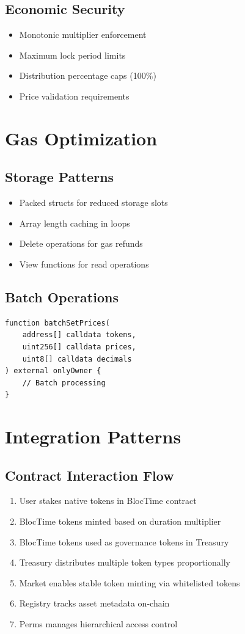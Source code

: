 \documentclass[11pt,a4paper]{article}
\begin{document}
\subsection{Economic Security}
\begin{itemize}
\item Monotonic multiplier enforcement
\item Maximum lock period limits
\item Distribution percentage caps (100\%)
\item Price validation requirements
\end{itemize}

\section{Gas Optimization}

\subsection{Storage Patterns}
\begin{itemize}
\item Packed structs for reduced storage slots
\item Array length caching in loops
\item Delete operations for gas refunds
\item View functions for read operations
\end{itemize}

\subsection{Batch Operations}
\begin{lstlisting}
function batchSetPrices(
    address[] calldata tokens,
    uint256[] calldata prices,
    uint8[] calldata decimals
) external onlyOwner {
    // Batch processing
}
\end{lstlisting}

\section{Integration Patterns}

\subsection{Contract Interaction Flow}

\begin{enumerate}
\item User stakes native tokens in BlocTime contract
\item BlocTime tokens minted based on duration multiplier
\item BlocTime tokens used as governance tokens in Treasury
\item Treasury distributes multiple token types proportionally
\item Market enables stable token minting via whitelisted tokens
\item Registry tracks asset metadata on-chain
\item Perms manages hierarchical access control
\end{enumerate}
\end{document}
